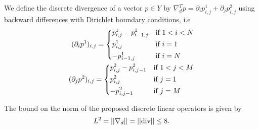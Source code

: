     \begin{definition} %
    \label{def:discrete_divergence_operator}

        We define the discrete divergence of a vector $p \in Y$ by $\nabla_{d}^{T} p = \partial_{i}p^{1}_{i, j} + \partial_{j}p^{2}_{i, j}$ using backward differences with Dirichlet boundary conditions, i.e
            \begin{eqnarray}
                (\partial_{i}p^{1})_{i, j} =
                    \begin{dcases*}
                        p^{1}_{i, j} - p^{1}_{i-1, j} & \textnormal{if $1 < i < N$}\\
                        p^{1}_{i, j} & \textnormal{if $i = 1$}\\
                        -p^{1}_{i-1, j} & \textnormal{if $i = N$}
                    \end{dcases*}
                \label{eq:backward_partial_i} \\
                (\partial_{j}p^{2})_{i, j} =
                    \begin{dcases*}
                        p^{2}_{i, j} - p^{2}_{i, j-1} & \textnormal{if $1 < j < M$}\\
                        p^{2}_{i, j} & \textnormal{if $j = 1$}\\
                        -p^{2}_{i, j-1} & \textnormal{if $j = M$}
                    \end{dcases*}
                \label{eq:backward_partial_j}
            \end{eqnarray}

    \end{definition}

    \begin{proposition} %
        \label{prop:bound_on_the_norm}

        The bound on the norm of the proposed discrete linear operators is given by
            \begin{equation}
                L^{2} = ||\nabla_{d}|| = ||\textnormal{div}|| \le 8.
            \end{equation}

    \end{proposition}

